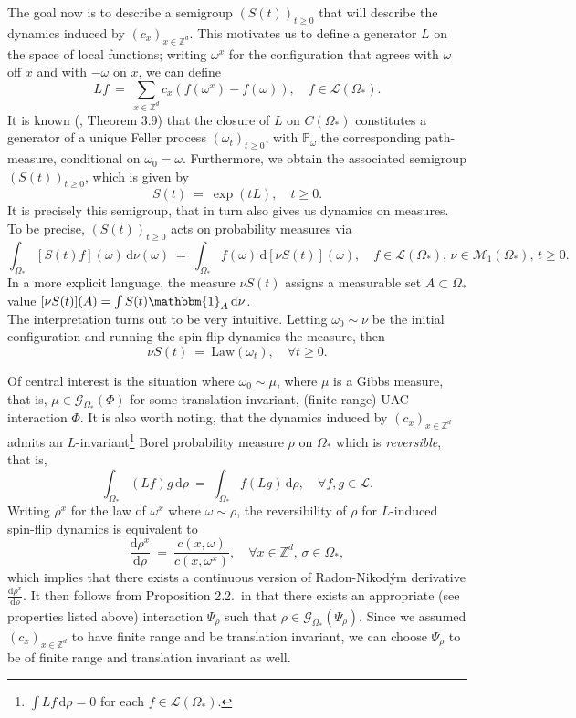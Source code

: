 \documentclass[12pt]{article}
\renewcommand{\d}{\mathrm{d}}
\newcommand{\G}{\mathcal{G}}
\newcommand{\Loc}{\mathcal{L}}
\newcommand{\M}{\mathcal{M}}
\renewcommand{\P}{\mathbb{P}}
\newcommand{\Z}{\mathbb{Z}}
\newcommand{\Law}{\mathrm{Law}}
\newcommand{\1}{\mathbbm{1}}
\newcommand{\5}{\vspace{0.5cm}}
\theoremstyle{definition}
\begin{document}
The goal now is to describe a semigroup $(S(t))_{t\geq 0}$ that will describe the dynamics induced by $(c_x)_{x\in\Z^d}$. This motivates us to define a generator $L$ on the space of local functions; writing $\omega^x$ for the configuration that agrees with $\omega$ off $x$ and with $-\omega$ on $x$, we can define
$$Lf ~=~ \sum_{x\in\Z^d}c_x(f(\omega^x)-f(\omega)), \quad f\in\Loc(\Omega_*).$$ It is known (\cite{Lig}, Theorem 3.9) that the closure of $L$ on $C(\Omega_*)$ constitutes a generator of a unique Feller process $(\omega_t)_{t\geq 0}$, with $\P_\omega$ the corresponding path-measure, conditional on $\omega_0=\omega$. Furthermore, we obtain the associated semigroup $(S(t))_{t\geq 0}$, which is given by
$$S(t) ~=~ \exp(tL), \quad t\geq 0.$$
It is precisely this semigroup, that in turn also gives us dynamics on measures. To be precise, $(S(t))_{t\geq 0}$ acts on probability measures via	
$$\int_{\Omega_*} [S(t)f](\omega)\,\d\nu(\omega) ~=~ \int_{\Omega_*}f(\omega)\,\d[\nu S(t)](\omega), \quad f\in\Loc(\Omega_*),\,\nu\in\M_1(\Omega_*),\,t\geq 0.$$
In a more explicit language, the measure $\nu S(t)$ assigns a measurable set $A\subset\Omega_*$  value $[\nu S(t)](A)=\int S(t)\1_A\,\d\nu$. \\

The interpretation turns out to be very intuitive. Letting $\omega_0\sim\nu$ be the initial configuration and running the spin-flip dynamics the measure, then
$$\nu S(t) ~=~ \Law(\omega_t), \quad \forall t\geq 0.$$ 

Of central interest is the situation where $\omega_0\sim\mu$, where $\mu$ is a Gibbs measure, that is, $\mu\in\G_{\Omega_*}(\Phi)$ for some translation invariant, (finite range) UAC interaction $\Phi$. It is also worth noting, that the dynamics induced by $(c_x)_{x\in\Z^d}$ admits an $L$-invariant\footnote{$\int Lf\,\d\rho=0$ for each $f\in\Loc(\Omega_*)$.} Borel probability measure $\rho$ on $\Omega_*$ which is \textit{reversible}, that is,
$$\int_{\Omega_*}(Lf)g\,\d\rho ~=~ \int_{\Omega_*}f(Lg)\,\d\rho, \quad \forall f,g\in\Loc.$$
Writing $\rho^x$ for the law of $\omega^x$ where $\omega\sim\rho$, the reversibility of $\rho$ for $L$-induced spin-flip dynamics is equivalent to
$$\frac{\d\rho^x}{\d\rho} ~=~ \frac{c(x,\omega)}{c(x,\omega^x)}, \quad \forall x\in\Z^d,\,\sigma\in\Omega_*,$$
which implies that there exists a continuous version of Radon-Nikod\'ym derivative $\frac{\d\rho^x}{\d\rho}$. It then follows from Proposition 2.2.~in \cite{EFHR} that there exists an appropriate (see properties listed above) interaction $\Psi_\rho$ such that $\rho\in\G_{\Omega_*}(\Psi_\rho)$. Since we assumed $(c_{x})_{x\in\Z^d}$ to have finite range and be translation invariant, we can choose $\Psi_\rho$ to be of finite range and translation invariant as well.\\
\end{document}

